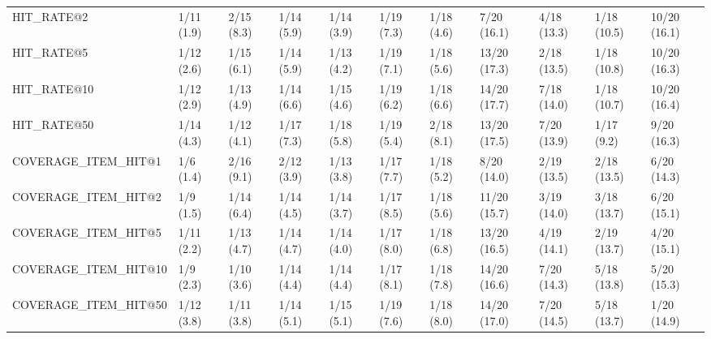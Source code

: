\begin{tabular}{lllllllllll}
HIT_RATE@2                  &     1/11 (1.9) &     2/15 (8.3) &    1/14 (5.9) &    1/14 (3.9) &  1/19 (7.3) &   1/18 (4.6) &    7/20 (16.1) &         4/18 (13.3) &  1/18 (10.5) &  10/20 (16.1) \\
HIT_RATE@5                  &     1/12 (2.6) &     1/15 (6.1) &    1/14 (5.9) &    1/13 (4.2) &  1/19 (7.1) &   1/18 (5.6) &   13/20 (17.3) &         2/18 (13.5) &  1/18 (10.8) &  10/20 (16.3) \\
HIT_RATE@10                 &     1/12 (2.9) &     1/13 (4.9) &    1/14 (6.6) &    1/15 (4.6) &  1/19 (6.2) &   1/18 (6.6) &   14/20 (17.7) &         7/18 (14.0) &  1/18 (10.7) &  10/20 (16.4) \\
HIT_RATE@50                 &     1/14 (4.3) &     1/12 (4.1) &    1/17 (7.3) &    1/18 (5.8) &  1/19 (5.4) &   2/18 (8.1) &   13/20 (17.5) &         7/20 (13.9) &   1/17 (9.2) &   9/20 (16.3) \\
COVERAGE_ITEM_HIT@1         &      1/6 (1.4) &     2/16 (9.1) &    2/12 (3.9) &    1/13 (3.8) &  1/17 (7.7) &   1/18 (5.2) &    8/20 (14.0) &         2/19 (13.5) &  2/18 (13.5) &   6/20 (14.3) \\
COVERAGE_ITEM_HIT@2         &      1/9 (1.5) &     1/14 (6.4) &    1/14 (4.5) &    1/14 (3.7) &  1/17 (8.5) &   1/18 (5.6) &   11/20 (15.7) &         3/19 (14.0) &  3/18 (13.7) &   6/20 (15.1) \\
COVERAGE_ITEM_HIT@5         &     1/11 (2.2) &     1/13 (4.7) &    1/14 (4.7) &    1/14 (4.0) &  1/17 (8.0) &   1/18 (6.8) &   13/20 (16.5) &         4/19 (14.1) &  2/19 (13.7) &   4/20 (15.1) \\
COVERAGE_ITEM_HIT@10        &      1/9 (2.3) &     1/10 (3.6) &    1/14 (4.4) &    1/14 (4.4) &  1/17 (8.1) &   1/18 (7.8) &   14/20 (16.6) &         7/20 (14.3) &  5/18 (13.8) &   5/20 (15.3) \\
COVERAGE_ITEM_HIT@50        &     1/12 (3.8) &     1/11 (3.8) &    1/14 (5.1) &    1/15 (5.1) &  1/19 (7.6) &   1/18 (8.0) &   14/20 (17.0) &         7/20 (14.5) &  5/18 (13.7) &   1/20 (14.9) \\
\bottomrule
\end{tabular}
